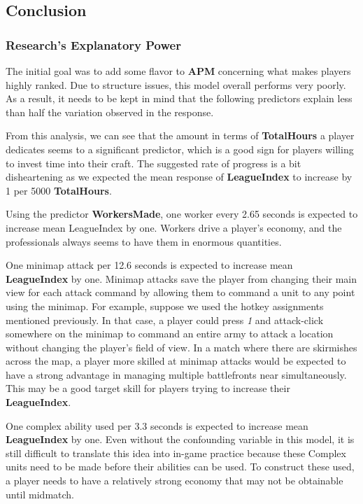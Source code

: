 \documentclass[]{article}
\begin{document}
\hypertarget{conclusion}{%
\subsection{Conclusion}\label{conclusion}}

\hypertarget{researchs-explanatory-power}{%
\subsubsection{Research's Explanatory
Power}\label{researchs-explanatory-power}}

The initial goal was to add some flavor to \textbf{APM} concerning what
makes players highly ranked. Due to structure issues, this model overall
performs very poorly. As a result, it needs to be kept in mind that the
following predictors explain less than half the variation observed in
the response.

From this analysis, we can see that the amount in terms of
\textbf{TotalHours} a player dedicates seems to a significant predictor,
which is a good sign for players willing to invest time into their
craft. The suggested rate of progress is a bit disheartening as we
expected the mean response of \textbf{LeagueIndex} to increase by 1 per
5000 \textbf{TotalHours}.

Using the predictor \textbf{WorkersMade}, one worker every 2.65 seconds
is expected to increase mean LeagueIndex by one. Workers drive a
player's economy, and the professionals always seems to have them in
enormous quantities.

One minimap attack per 12.6 seconds is expected to increase mean
\textbf{LeagueIndex} by one. Minimap attacks save the player from
changing their main view for each attack command by allowing them to
command a unit to any point using the minimap. For example, suppose we
used the hotkey assignments mentioned previously. In that case, a player
could press \emph{1} and attack-click somewhere on the minimap to
command an entire army to attack a location without changing the
player's field of view. In a match where there are skirmishes across the
map, a player more skilled at minimap attacks would be expected to have
a strong advantage in managing multiple battlefronts near
simultaneously. This may be a good target skill for players trying to
increase their \textbf{LeagueIndex}.

One complex ability used per 3.3 seconds is expected to increase mean
\textbf{LeagueIndex} by one. Even without the confounding variable in
this model, it is still difficult to translate this idea into in-game
practice because these Complex units need to be made before their
abilities can be used. To construct these used, a player needs to have a
relatively strong economy that may not be obtainable until midmatch.
\end{document}
